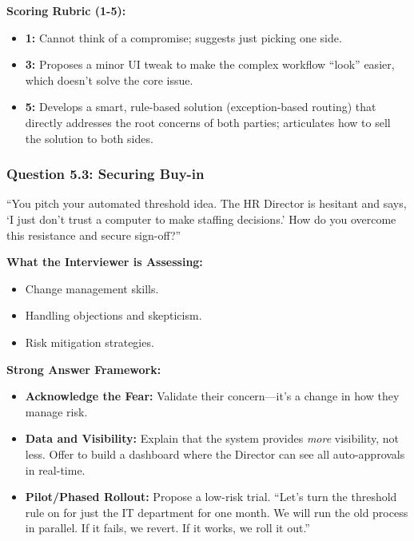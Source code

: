 \documentclass[
  11pt,
  openany,
  oneside]{book}
\providecommand{\tightlist}{%
  \setlength{\itemsep}{0pt}\setlength{\parskip}{0pt}}
\begin{document}
\textbf{Scoring Rubric (1-5):}

\begin{itemize}
\tightlist
\item
  \textbf{1:} Cannot think of a compromise; suggests just picking one
  side.
\item
  \textbf{3:} Proposes a minor UI tweak to make the complex workflow
  ``look'' easier, which doesn't solve the core issue.
\item
  \textbf{5:} Develops a smart, rule-based solution (exception-based
  routing) that directly addresses the root concerns of both parties;
  articulates how to sell the solution to both sides.
\end{itemize}

\subsubsection{Question 5.3: Securing
Buy-in}\label{question-5.3-securing-buy-in}

``You pitch your automated threshold idea. The HR Director is hesitant
and says, `I just don't trust a computer to make staffing decisions.'
How do you overcome this resistance and secure sign-off?''

\textbf{What the Interviewer is Assessing:}

\begin{itemize}
\tightlist
\item
  Change management skills.
\item
  Handling objections and skepticism.
\item
  Risk mitigation strategies.
\end{itemize}

\textbf{Strong Answer Framework:}

\begin{itemize}
\tightlist
\item
  \textbf{Acknowledge the Fear:} Validate their concern---it's a change
  in how they manage risk.
\item
  \textbf{Data and Visibility:} Explain that the system provides
  \emph{more} visibility, not less. Offer to build a dashboard where the
  Director can see all auto-approvals in real-time.
\item
  \textbf{Pilot/Phased Rollout:} Propose a low-risk trial. ``Let's turn
  the threshold rule on for just the IT department for one month. We
  will run the old process in parallel. If it fails, we revert. If it
  works, we roll it out.''
\end{itemize}
\end{document}
